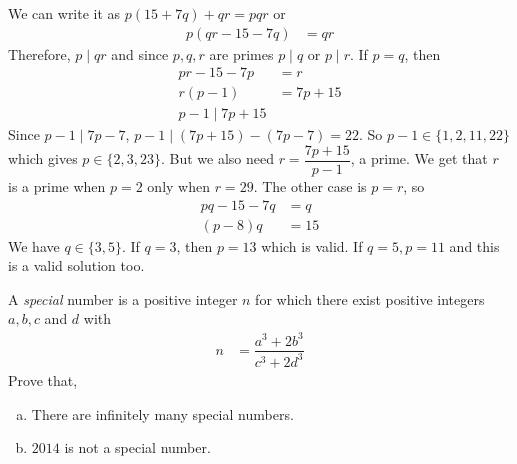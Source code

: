 \begin{solution}
	We can write it as $p(15+7q)+qr=pqr$ or
		\begin{align*}
			p(qr-15-7q) & = qr
		\end{align*}
	Therefore, $p\mid qr$ and since $p,q,r$ are primes $p\mid q$ or $p\mid r$. If $p=q$, then
		\begin{align*}
			pr-15-7p & = r\\
			r(p-1) & = 7p+15\\
			p-1\mid 7p+15
		\end{align*}
	Since $p-1\mid 7p-7$, $p-1\mid (7p+15)-(7p-7)=22$. So $p-1\in\{1,2,11,22\}$ which gives $p\in\{2,3,23\}$. But we also need $r=\dfrac{7p+15}{p-1}$, a prime. We get that $r$ is a prime when $p=2$ only when $r=29$. The other case is $p=r$, so
		\begin{align*}
			pq-15-7q & = q\\
			(p-8)q & = 15
		\end{align*}
	We have $q\in\{3,5\}$. If $q=3$, then $p=13$ which is valid. If $q=5,p=11$ and this is a valid solution too.
\end{solution}

\begin{problem}[Serbia $2014$]
	A \textit{special} number is a positive integer $n$ for which there exist positive integers $a, b, c$ and $d$ with
		\begin{align*}
			n & = \dfrac{a^3+2b^3}{c^3+2d^3}
		\end{align*}
	Prove that,
		\begin{enumerate}[a.]
			\item There are infinitely many special numbers.
			\item $2014$ is not a special number.
		\end{enumerate}
\end{problem}

